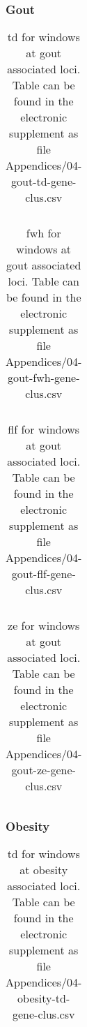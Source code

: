 \documentclass[]{report}
\begin{document}
\subsubsection{Gout}\label{gout}

\begin{table}[!htb]
\caption{\gls{td} for windows at gout associated loci. Table can be found in the electronic supplement as file Appendices/04-gout-td-gene-clus.csv}
\centering
  \begin{tabular}{l l}
  \end{tabular}
  \label{tab:gouttdgeneclus}
\end{table}

\begin{table}[!htb]
\caption{\gls{fwh} for windows at gout associated loci. Table can be found in the electronic supplement as file Appendices/04-gout-fwh-gene-clus.csv}
\centering
  \begin{tabular}{l l}
  \end{tabular}
  \label{tab:goutfwhgeneclus}
\end{table}

\begin{table}[!htb]
\caption{\gls{flf} for windows at gout associated loci. Table can be found in the electronic supplement as file Appendices/04-gout-flf-gene-clus.csv}
\centering
  \begin{tabular}{l l}
  \end{tabular}
  \label{tab:goutflfgeneclus}
\end{table}

\begin{table}[!htb]
\caption{\gls{ze} for windows at gout associated loci. Table can be found in the electronic supplement as file Appendices/04-gout-ze-gene-clus.csv}
\centering
  \begin{tabular}{l l}
  \end{tabular}
  \label{tab:goutzegeneclus}
\end{table}

\FloatBarrier

\subsubsection{Obesity}\label{obesity}

\begin{table}[!htb]
\caption{\gls{td} for windows at obesity associated loci. Table can be found in the electronic supplement as file Appendices/04-obesity-td-gene-clus.csv}
\centering
  \begin{tabular}{l l}
  \end{tabular}
  \label{tab:obesitytdgeneclus}
\end{table}
\end{document}
